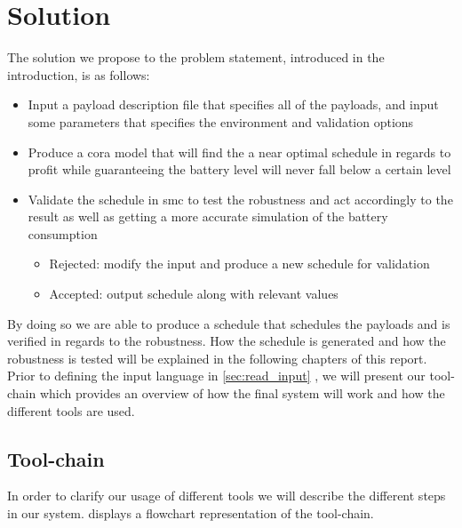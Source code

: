 \section{Solution} \label{sec:solution}
The solution we propose to the problem statement, introduced in the introduction, is as follows:
\begin{itemize}
	\item	Input a payload description file that specifies all of the payloads, and input some parameters that specifies the environment and validation options
	\item	Produce a \gls{cora} model that will find the a near optimal schedule in regards to profit while guaranteeing the battery level will never fall below a certain level
	\item	Validate the schedule in \gls{smc} to test the robustness and act accordingly to the result as well as getting a more accurate simulation of the battery consumption
	\begin{itemize}
		\item	Rejected: modify the input and produce a new schedule for validation
		\item	Accepted: output schedule along with relevant values
	\end{itemize}
\end{itemize}

By doing so we are able to produce a schedule that schedules the payloads and is verified in regards to the robustness.
How the schedule is generated and how the robustness is tested will be explained in the following chapters of this report.
Prior to defining the input language in \cref{sec:read_input} , we will present our tool-chain which provides an overview of how the final system will work and how the different tools are used.

\subsection{Tool-chain} \label{subsec:tool_chainv}
In order to clarify our usage of different tools we will describe the different steps in our system. 
 displays a flowchart representation of the tool-chain.

